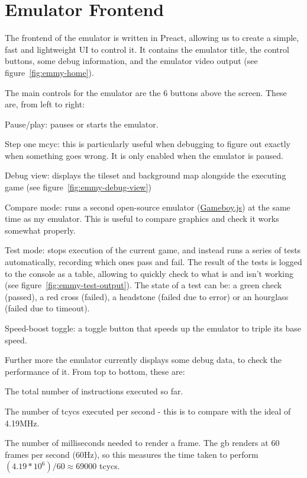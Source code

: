 \documentclass[11pt]{report}
\begin{document}
\section{Emulator Frontend}

The frontend of the emulator is written in Preact, allowing us to create a simple, fast and lightweight UI to control it. It contains the emulator title, the control buttons, some debug information, and the emulator video output (see figure~\ref{fig:emmy-home}).

The main controls for the emulator are the 6 buttons above the screen. These are, from left to right:
\begin{compactitem}
    \item Pause/play: pauses or starts the emulator.
    \item Step one \gls{mcyc}: this is particularly useful when debugging to figure out exactly when something goes wrong. It is only enabled when the emulator is paused.
    \item Debug view: displays the tileset and background map alongside the executing game (see figure~\ref{fig:emmy-debug-view})
    \item Compare mode: runs a second open-source emulator (\href{https://github.com/juchi/gameboy.js/}{Gameboy.js}) at the same time as my emulator. This is useful to compare graphics and check it works somewhat properly.
    \item Test mode: stops execution of the current game, and instead runs a series of tests automatically, recording which ones pass and fail. The result of the tests is logged to the console as a table, allowing to quickly check to what is and isn't working (see figure~\ref{fig:emmy-test-output}). The state of a test can be: a green check (passed), a red cross (failed), a headstone (failed due to error) or an hourglass (failed due to timeout).
    \item Speed-boost toggle: a toggle button that speeds up the emulator to triple its base speed.
\end{compactitem}

Further more the emulator currently displays some debug data, to check the performance of it. From top to bottom, these are:
\begin{compactitem}
    \item The total number of instructions executed so far.
    \item The number of \glspl{tcyc} executed per second - this is to compare with the ideal of 4.19MHz.
    \item The number of milliseconds needed to render a frame. The \gls{gb} renders at 60 frames per second (60Hz), so this measures the time taken to perform $(4.19*10^6)/60\approx 69000$ \glspl{tcyc}.
\end{compactitem}
\end{document}
